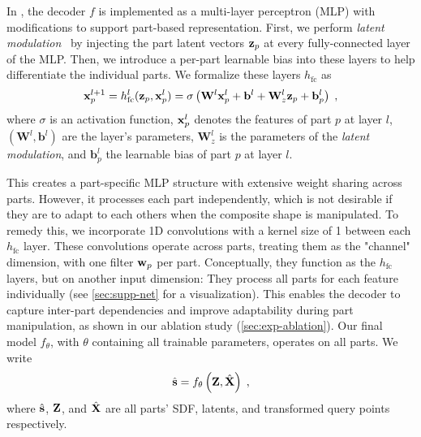 In \PSDF{}, the decoder $f$ is implemented as a multi-layer perceptron (MLP) with modifications to support part-based representation. First, we perform \textit{latent modulation}~\cite{Dupont22} by injecting the part latent vectors $\mathbf{z}_p$ at every fully-connected layer of the MLP. Then, we introduce a per-part learnable bias into these layers to help differentiate the individual parts. 
We formalize these layers $h_{\mathrm{fc}}$ as
%
\begin{equation}
	\mathbf{x}_p^{l+1} = h_{\mathrm{fc}}^l(\mathbf{z}_p, \mathbf{x}_p^l) = \sigma\left( \mathbf{W}^l \mathbf{x}_p^l + \mathbf{b}^l + \mathbf{W}_z^l \mathbf{z}_p + \mathbf{b}_p^l \right) \; ,
\end{equation}
%
where $\sigma$ is an activation function, $\mathbf{x}_p^l$ denotes the features of part $p$ at layer $l$, $(\mathbf{W}^l, \mathbf{b}^l)$ are the layer's parameters, $\mathbf{W}_z^l $ is the parameters of the \textit{latent modulation}, and $\mathbf{b}_p^l$ the learnable bias of part $p$ at layer $l$. 

This creates a part-specific MLP structure with extensive weight sharing across parts. However, it processes each part independently, which is not desirable if they are to adapt to each others when the composite shape is manipulated.
To remedy this, we incorporate 1D convolutions with a kernel size of 1 between each $h_{\mathrm{fc}}$ layer. These convolutions operate across parts, treating them as the "channel" dimension, with one filter $\mathbf{w}_p$ per part. Conceptually, they function as the $h_{\mathrm{fc}}$ layers, but on another input dimension: They process all parts for each feature individually (see \cref{sec:supp-net} for a visualization). This enables the decoder to capture inter-part dependencies and improve adaptability during part manipulation, as shown in our ablation study (\cref{sec:exp-ablation}). Our final model $f_\theta$, with $\theta$ containing all trainable parameters, operates on all parts. We write
%
\begin{equation}
	\hat{\mathbf{s}} = f_\theta\left( \mathbf{Z}, \hat{\mathbf{X}}  \right) \; ,
\end{equation}
%
where $\hat{\mathbf{s}}$, $\mathbf{Z}$, and $\hat{\mathbf{X}}$ are all parts' SDF, latents, and transformed query points respectively.

